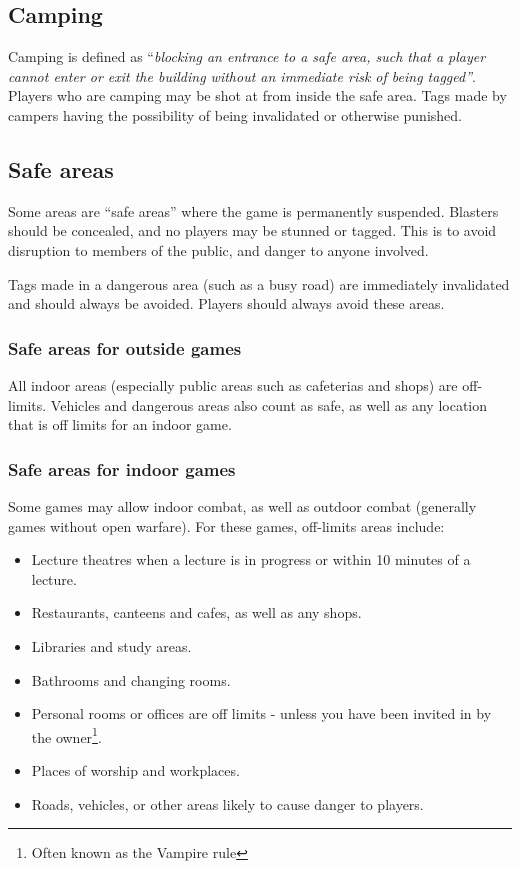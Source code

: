 \documentclass{article}
\begin{document}
	\subsection{Camping}

		Camping is defined as ``{\em blocking an entrance to a safe area, such that a player cannot enter or exit the building without an immediate risk of being tagged''}. Players who are camping may be shot at from inside the safe area. Tags made by campers having the possibility of being invalidated or otherwise punished.
	
	\subsection{Safe areas}
	
		Some areas are ``safe areas'' where the game is permanently suspended. Blasters should be concealed, and no players may be stunned or tagged. This is to avoid disruption to members of the public, and danger to anyone involved.
		
		Tags made in a dangerous area (such as a busy road) are immediately invalidated and should always be avoided. Players should always avoid these areas.
		
		\subsubsection{Safe areas for outside games}

			All indoor areas (especially public areas such as cafeterias and shops) are off-limits. Vehicles and dangerous areas also count as safe, as well as any location that is off limits for an indoor game.
		
		\subsubsection{Safe areas for indoor games}

			Some games may allow indoor combat, as well as outdoor combat (generally games without open warfare). For these games, off-limits areas include:

			\begin{itemize}
				\item Lecture theatres when a lecture is in progress or within 10 minutes of a lecture.
				\item Restaurants, canteens and cafes, as well as any shops.
				\item Libraries and study areas.
				\item Bathrooms and changing rooms.
				\item Personal rooms or offices are off limits - unless you have been invited in by the owner\footnote{Often known as the Vampire rule}.
				\item Places of worship and workplaces.
				\item Roads, vehicles, or other areas likely to cause danger to players.
			\end{itemize}
\end{document}
